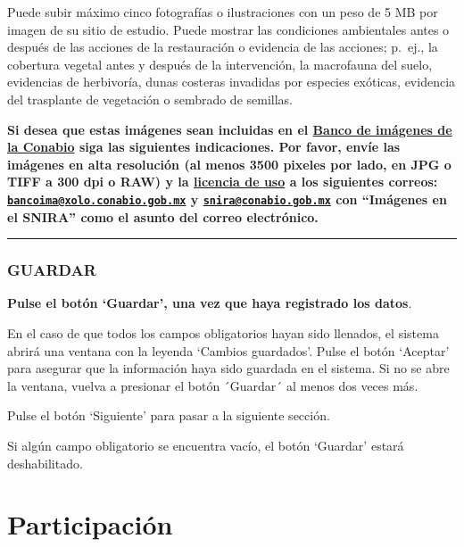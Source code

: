 \documentclass[
]{book}
\begin{document}
Puede subir máximo cinco fotografías o ilustraciones con un peso de 5 MB por imagen de su sitio de estudio. Puede mostrar las condiciones ambientales antes o después de las acciones de la restauración o evidencia de las acciones; p.~ej., la cobertura vegetal antes y después de la intervención, la macrofauna del suelo, evidencias de herbivoría, dunas costeras invadidas por especies exóticas, evidencia del trasplante de vegetación o sembrado de semillas.

\textbf{Si desea que estas imágenes sean incluidas en el \href{https://bdi.conabio.gob.mx/fotoweb/}{Banco de imágenes de la Conabio} siga las siguientes indicaciones. Por favor, envíe las imágenes en alta resolución (al menos 3500 pixeles por lado, en JPG o TIFF a 300 dpi o RAW) y la \href{https://docs.google.com/document/d/1CJA0fytTKF3pLVnFdlBK0gG5upLSupsU/edit}{licencia de uso} a los siguientes correos: \href{mailto:bancoima@xolo.conabio.gob.mx}{\nolinkurl{bancoima@xolo.conabio.gob.mx}} y \href{mailto:snira@conabio.gob.mx}{\nolinkurl{snira@conabio.gob.mx}} con ``Imágenes en el SNIRA'' como el asunto del correo electrónico.}

\begin{center}\rule{0.5\linewidth}{0.5pt}\end{center}

\hypertarget{guardar}{%
\subsection*{GUARDAR}\label{guardar}}

\textbf{Pulse el botón `Guardar', una vez que haya registrado los datos}.

En el caso de que todos los campos obligatorios hayan sido llenados, el sistema abrirá una ventana con la leyenda `Cambios guardados'. Pulse el botón `Aceptar' para asegurar que la información haya sido guardada en el sistema. Si no se abre la ventana, vuelva a presionar el botón ´Guardar´ al menos dos veces más.

Pulse el botón `Siguiente' para pasar a la siguiente sección.

Si algún campo obligatorio se encuentra vacío, el botón `Guardar' estará deshabilitado.

\hypertarget{participaciuxf3n}{%
\chapter{Participación}\label{participaciuxf3n}}
\end{document}

